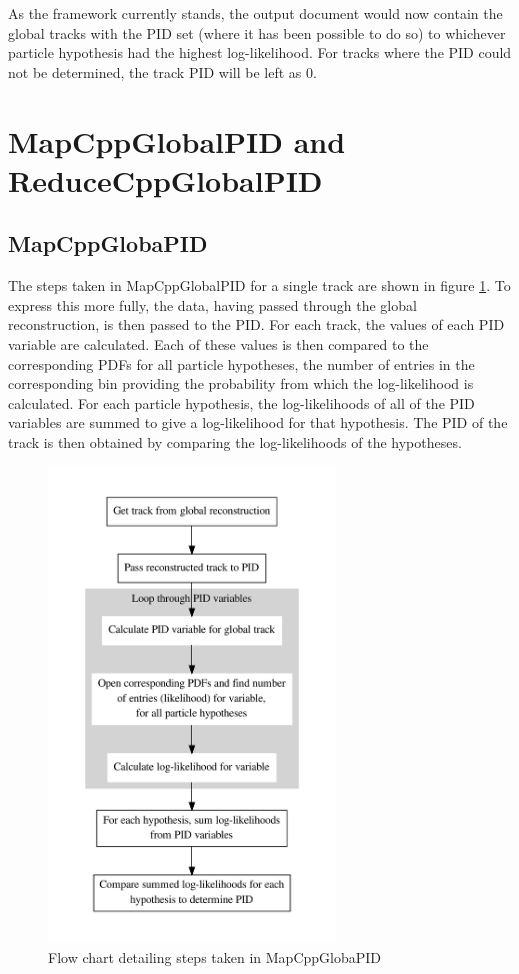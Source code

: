 As the framework currently stands, the output document would now contain the global tracks with the PID set (where it has been possible to do so) to whichever particle hypothesis had the highest log-likelihood. For tracks where the PID could not be determined, the track PID will be left as 0.

\section{MapCppGlobalPID and ReduceCppGlobalPID}
\label{mapred}
\subsection{MapCppGlobaPID}
\label{map}
The steps taken in MapCppGlobalPID for a single track are shown in 
figure \ref{mapflow}. To express this more fully, the data, having passed through the global reconstruction, is then passed to the PID. For each track, the values of each PID variable are calculated. Each of these values is then compared to the corresponding PDFs for all particle hypotheses, the number of entries in the corresponding bin providing the probability from which the log-likelihood is calculated. For each particle hypothesis, the log-likelihoods of all of the PID variables are summed to give a log-likelihood for that hypothesis. The PID of the track is then obtained by comparing the log-likelihoods of the hypotheses.
\begin{figure}[h!]
\begin{center} 
\includegraphics[width=3in]{reconstruction/globalpid/PIDflow.pdf} 
\caption{Flow chart detailing steps taken in MapCppGlobaPID}
\label{mapflow}
\end{center} 
\end{figure}

